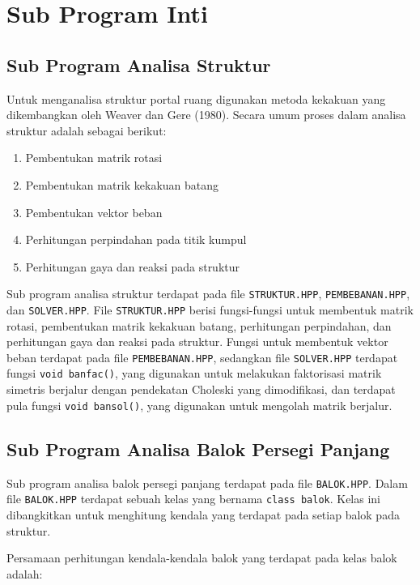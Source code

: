 \section{Sub Program Inti}

\subsection{Sub Program Analisa Struktur}

Untuk menganalisa struktur portal ruang digunakan metoda kekakuan yang
dikembangkan oleh Weaver dan Gere (1980). Secara umum proses dalam
analisa struktur adalah sebagai berikut:
\begin{enumerate}[label=\arabic*.]
\item Pembentukan matrik rotasi
\item Pembentukan matrik kekakuan batang
\item Pembentukan vektor beban
\item Perhitungan perpindahan pada titik kumpul
\item Perhitungan gaya dan reaksi pada struktur
\end{enumerate}
Sub program analisa struktur terdapat pada file \texttt{STRUKTUR.HPP},
\texttt{PEMBEBANAN.HPP}, dan \texttt{SOLVER.HPP}. File \texttt{STRUKTUR.HPP}
berisi fungsi-fungsi untuk membentuk matrik rotasi, pembentukan matrik
kekakuan batang, perhitungan perpindahan, dan perhitungan gaya dan reaksi
pada struktur. Fungsi untuk membentuk vektor beban terdapat pada file
\texttt{PEMBEBANAN.HPP}, sedangkan file \texttt{SOLVER.HPP} terdapat
fungsi \texttt{void banfac()}, yang digunakan untuk melakukan faktorisasi
matrik simetris berjalur dengan pendekatan Choleski yang dimodifikasi, dan
terdapat pula fungsi \texttt{void bansol()}, yang digunakan untuk
mengolah matrik berjalur.

\subsection{Sub Program Analisa Balok Persegi Panjang}

Sub program analisa balok persegi panjang terdapat pada file
\texttt{BALOK.HPP}. Dalam file \texttt{BALOK.HPP} terdapat sebuah kelas
yang bernama \texttt{class balok}. Kelas ini dibangkitkan untuk menghitung
kendala yang terdapat pada setiap balok pada struktur.

Persamaan perhitungan kendala-kendala balok yang terdapat pada kelas
balok adalah:

